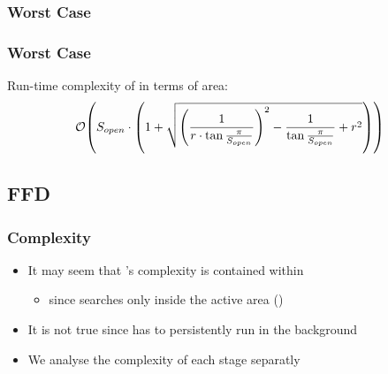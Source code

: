 \begin{frame}
\frametitle{\WFD Worst Case}
\begin{figure}
\centering
{}
\end{figure}
\end{frame}

\begin{frame}
\label{frame:wfd_complexity}
\frametitle{\WFD Worst Case}
Run-time complexity of \WFD in terms of \openspace area: 
$$
  \mathcal{O}{\left(S_{open}\cdot 
  {\left(
  1+
  \sqrt{{\left(\frac{1}{r\cdot\tan{\frac{\pi}{S_{open}}}}\right)}^2
        -\frac{1}{\tan{\frac{\pi}{S_{open}}}} + r^2}\right)}\right)}
  $$  
\hyperlink{frame:wfd_complexity_details}{}
\end{frame}


\subsection*{FFD}
\begin{frame}
\frametitle{\FFD Complexity}
\begin{itemize}
  \item It may seem that \FFD's complexity is contained within \WFD
  	\begin{itemize}
  	  \item since \FFD searches only inside the active area (\openspace)
  	\end{itemize}
  \item It is not true since \FFD has to persistently run in the background
  \item We analyse the complexity of each stage separatly
\end{itemize}
\end{frame}


